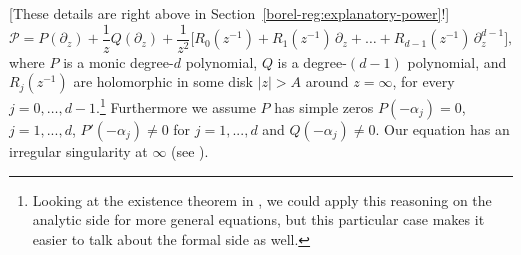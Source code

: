 \documentclass{article}
\theoremstyle{definition}
\theoremstyle{plain}
\begin{document}
\color{Goldenrod}
[These details are right above in Section~\ref{borel-reg:explanatory-power}!]
\begin{equation}%
\mathcal{P} = P(\partial_z) + \frac{1}{z} Q(\partial_z) + \frac{1}{z^2}\big[ R_0(z^{-1}) + R_1(z^{-1})\,\partial_z + \ldots + R_{d-1}(z^{-1})\,\partial_z^{d-1} \big],
\end{equation}
where $P$ is a monic degree-$d$ polynomial, $Q$ is a degree-$(d-1)$ polynomial, and $R_j(z^{-1})$ are holomorphic in some disk $|z| > A$ around $z = \infty$, for every $j=0,\ldots, d-1$.\footnote{Looking at the existence theorem in \cite[Theorem 4]{reg-sing-volterra}, we could apply this reasoning on the analytic side for more general equations, but this particular case makes it easier to talk about the formal side as well.} Furthermore we assume $P$ has simple zeros $P(-\alpha_j)=0$, $j=1,...,d$, $P'(-\alpha_j)\neq 0$ for $j=1,...,d$ and $Q(-\alpha_j)\neq 0$. Our equation has an irregular singularity at $\infty$ (see \cite[Definition 3.3.2]{diverg-resurg--ii}).
\color{black}
\end{document}

